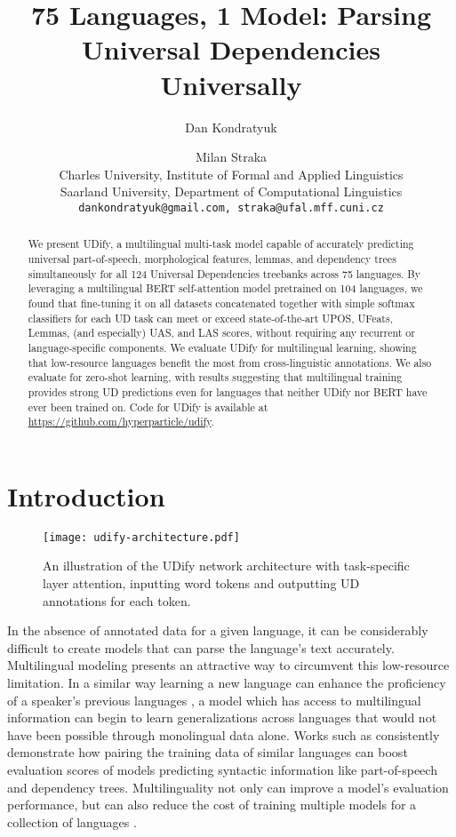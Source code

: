 \documentclass[11pt,a4paper]{article}
\title{75 Languages, 1 Model: Parsing Universal Dependencies Universally}
\author{
    Dan Kondratyuk \and
    Milan Straka \\
    Charles University, Institute of Formal and Applied Linguistics\\
    Saarland University, Department of Computational Linguistics \\
    {\tt\footnotesize dankondratyuk@gmail.com, straka@ufal.mff.cuni.cz}
}
\date{}
\begin{document}
\maketitle
\begin{abstract}
    We present UDify, a multilingual multi-task model capable of accurately predicting universal part-of-speech, morphological features, lemmas, and dependency trees simultaneously for all 124 Universal Dependencies treebanks across 75 languages.
    By leveraging a multilingual BERT self-attention model pretrained on 104 languages, we found that fine-tuning it on all datasets concatenated together with simple softmax classifiers for each UD task can meet or exceed state-of-the-art UPOS, UFeats, Lemmas, (and especially) UAS, and LAS scores, without requiring any recurrent or language-specific components.
    We evaluate UDify for multilingual learning, showing that low-resource languages benefit the most from cross-linguistic annotations.
    We also evaluate for zero-shot learning, with results suggesting that multilingual training provides strong UD predictions even for languages that neither UDify nor BERT have ever been trained on.
Code for UDify is available at \url{https://github.com/hyperparticle/udify}.
\end{abstract}

\section{Introduction}

\begin{figure}[!ht]
    \centering
    \texttt{[image: udify-architecture.pdf]}
    \caption{\label{fig:udify-architecture}
        An illustration of the UDify network architecture with task-specific layer attention, inputting word tokens and outputting UD annotations for each token.
    }
\end{figure}

In the absence of annotated data for a given language, it can be considerably difficult to create models that can parse the language's text accurately.
Multilingual modeling presents an attractive way to circumvent this low-resource limitation.
In a similar way learning a new language can enhance the proficiency of a speaker's previous languages \cite{abu2010advantages}, a model which has access to multilingual information can begin to learn generalizations across languages that would not have been possible through monolingual data alone.
Works such as  consistently demonstrate how pairing the training data of similar languages can boost evaluation scores of models predicting syntactic information like part-of-speech and dependency trees.
Multilinguality not only can improve a model's evaluation performance, but can also reduce the cost of training multiple models for a collection of languages \cite{johnson2017google, smith201882}.
\end{document}
